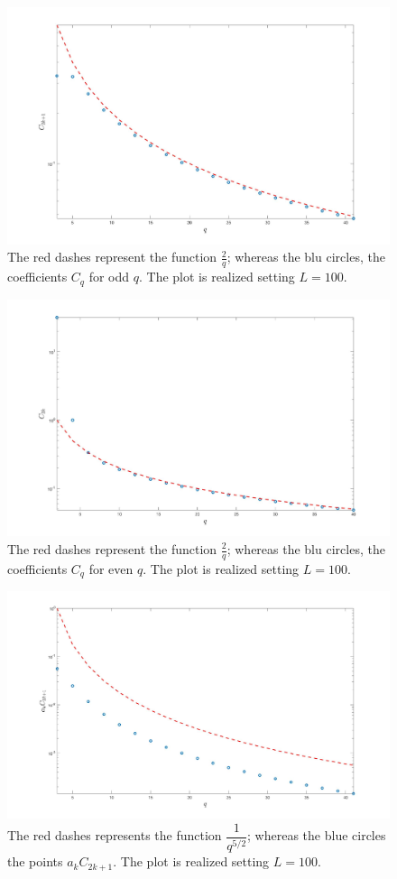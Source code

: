 \documentclass[aps,prd,showpacs,superscriptaddress,groupedaddress]{revtex4-1}  %
\begin{document}
\begin{figure}[h!]
	\centering
	\includegraphics[width=0.8\linewidth]{Cqcome2suqcopy}
	\caption{The red dashes represent the function $\frac{2}{q}$; whereas the blu circles, the coefficients $C_q$ for odd $q$. The plot is realized setting $L=100$.}
	\label{fig:cqcome2suqcopy}
\end{figure}
\begin{figure}[h!]
	\centering
	\includegraphics[width=0.8\linewidth]{C2k}
	\caption{The red dashes represent the function $\frac{2}{q}$; whereas the blu circles, the coefficients $C_q$ for even $q$. The plot is realized setting $L=100$.}
	\label{fig:c2k}
\end{figure}


\begin{figure}[h!]
	\centering
	\includegraphics[width=0.8\linewidth]{akc2k1comeq5mezzi}
	\caption{The red dashes represents the function $\dfrac{1}{q^{5/2}}$; whereas the blue circles the points $a_kC_{2k+1}$. The plot is realized setting $L=100$.}
	\label{fig:akc2k1comeq5mezzi}
\end{figure}
\end{document}
